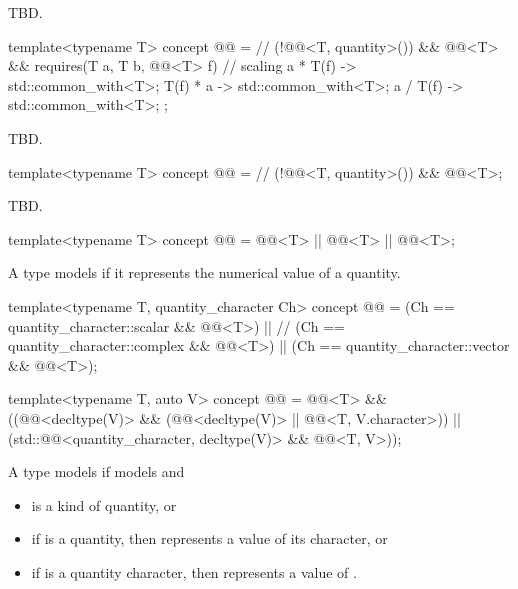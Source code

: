 \pnum
TBD.

\begin{itemdecl}
template<typename T>
concept @@ =  // \expos
  (!@@<T, quantity>()) && @@<T> &&
  requires(T a, T b, @@<T> f) {
    // scaling
    { a * T(f) } -> std::common_with<T>;
    { T(f) * a } -> std::common_with<T>;
    { a / T(f) } -> std::common_with<T>;
  };
\end{itemdecl}

\pnum
TBD.

\begin{itemdecl}
template<typename T>
concept @@ =  // \expos
  (!@@<T, quantity>()) && @@<T>;
\end{itemdecl}

\pnum
TBD.

\begin{itemdecl}
template<typename T>
concept @@ = @@<T> || @@<T> ||
                         @@<T>;
\end{itemdecl}

\pnum
A type  models  if
it represents the numerical value of a quantity.

\begin{itemdecl}
template<typename T, quantity_character Ch>
concept @@ = (Ch == quantity_character::scalar && @@<T>) ||  // \expos
                        (Ch == quantity_character::complex && @@<T>) ||
                        (Ch == quantity_character::vector && @@<T>);

template<typename T, auto V>
concept @@ =
  @@<T> && ((@@<decltype(V)> &&
                         (@@<decltype(V)> || @@<T, V.character>)) ||
                        (std::@@<quantity_character, decltype(V)> && @@<T, V>));
\end{itemdecl}

\pnum
A type  models  if
 models  and
\begin{itemize}
\item
{} is a kind of quantity, or
\item
if  is a quantity, then  represents a value of its character, or
\item
if  is a quantity character, then  represents a value of .
\end{itemize}

